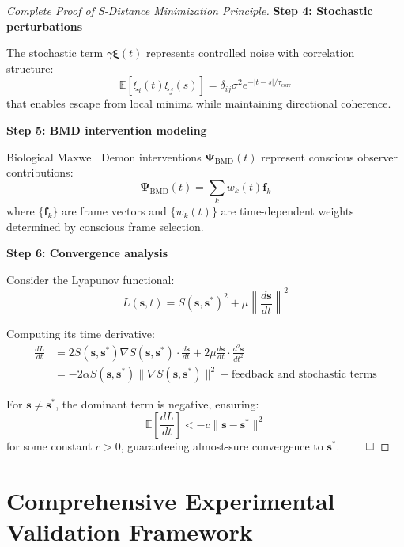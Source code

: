 \documentclass[11pt]{article}
\theoremstyle{definition}
\theoremstyle{remark}
\newcommand{\Expectation}{\mathbb{E}}
\begin{document}
\begin{proof}[Complete Proof of S-Distance Minimization Principle]
\textbf{Step 4: Stochastic perturbations}

The stochastic term $\gamma \mathbf{\xi}(t)$ represents controlled noise with correlation structure:
\begin{equation}
\Expectation[\xi_i(t) \xi_j(s)] = \delta_{ij} \sigma^2 e^{-|t-s|/\tau_{\text{corr}}}
\end{equation}
that enables escape from local minima while maintaining directional coherence.

\textbf{Step 5: BMD intervention modeling}

Biological Maxwell Demon interventions $\mathbf{\Psi}_{\text{BMD}}(t)$ represent conscious observer contributions:
\begin{equation}
\mathbf{\Psi}_{\text{BMD}}(t) = \sum_{k} w_k(t) \mathbf{f}_k
\end{equation}
where $\{\mathbf{f}_k\}$ are frame vectors and $\{w_k(t)\}$ are time-dependent weights determined by conscious frame selection.

\textbf{Step 6: Convergence analysis}

Consider the Lyapunov functional:
\begin{equation}
L(\mathbf{s}, t) = S(\mathbf{s}, \mathbf{s}^*)^2 + \mu \left\|\frac{d\mathbf{s}}{dt}\right\|^2
\end{equation}

Computing its time derivative:
\begin{align}
\frac{dL}{dt} &= 2 S(\mathbf{s}, \mathbf{s}^*) \nabla S(\mathbf{s}, \mathbf{s}^*) \cdot \frac{d\mathbf{s}}{dt} + 2\mu \frac{d\mathbf{s}}{dt} \cdot \frac{d^2\mathbf{s}}{dt^2} \\
&= -2\alpha S(\mathbf{s}, \mathbf{s}^*) \|\nabla S(\mathbf{s}, \mathbf{s}^*)\|^2 + \text{feedback and stochastic terms}
\end{align}

For $\mathbf{s} \neq \mathbf{s}^*$, the dominant term is negative, ensuring:
\begin{equation}
\Expectation\left[\frac{dL}{dt}\right] < -c \|\mathbf{s} - \mathbf{s}^*\|^2
\end{equation}
for some constant $c > 0$, guaranteeing almost-sure convergence to $\mathbf{s}^*$. $\qed$
\end{proof}

\section{Comprehensive Experimental Validation Framework}
\end{document}
